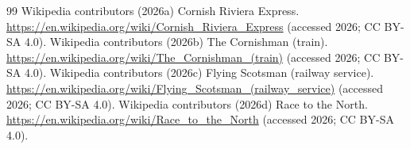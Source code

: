 \begin{thebibliography}{99}
 Wikipedia contributors (2026a) Cornish Riviera Express. \url{https://en.wikipedia.org/wiki/Cornish_Riviera_Express} (accessed 2026; CC BY-SA 4.0).
 Wikipedia contributors (2026b) The Cornishman (train). \url{https://en.wikipedia.org/wiki/The_Cornishman_(train)} (accessed 2026; CC BY-SA 4.0).
 Wikipedia contributors (2026c) Flying Scotsman (railway service). \url{https://en.wikipedia.org/wiki/Flying_Scotsman_(railway_service)} (accessed 2026; CC BY-SA 4.0).
 Wikipedia contributors (2026d) Race to the North. \url{https://en.wikipedia.org/wiki/Race_to_the_North} (accessed 2026; CC BY-SA 4.0).
\end{thebibliography}
